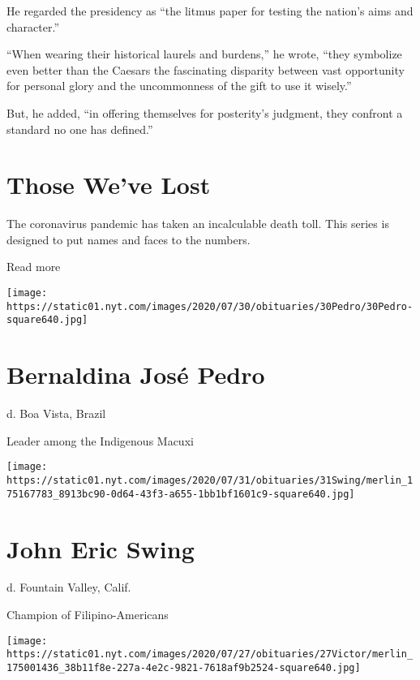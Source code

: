 He regarded the presidency as ``the litmus paper for testing the
nation's aims and character.''

``When wearing their historical laurels and burdens,'' he wrote, ``they
symbolize even better than the Caesars the fascinating disparity between
vast opportunity for personal glory and the uncommonness of the gift to
use it wisely.''

But, he added, ``in offering themselves for posterity's judgment, they
confront a standard no one has defined.''

\href{https://www.nytimes.com/interactive/2020/obituaries/people-died-coronavirus-obituaries.html?action=click\&pgtype=Article\&state=default\&region=BELOW_MAIN_CONTENT\&context=covid_obits_promo}{}

\hypertarget{those-weve-lost}{%
\section{Those We've Lost}\label{those-weve-lost}}

The coronavirus pandemic has taken an incalculable death toll. This
series is designed to put names and faces to the numbers.

Read more

\texttt{[image: https://static01.nyt.com/images/2020/07/30/obituaries/30Pedro/30Pedro-square640.jpg]}

\hypertarget{bernaldina-josuxe9-pedro}{%
\section{Bernaldina José Pedro}\label{bernaldina-josuxe9-pedro}}

d. Boa Vista, Brazil

Leader among the Indigenous Macuxi

\texttt{[image: https://static01.nyt.com/images/2020/07/31/obituaries/31Swing/merlin\_175167783\_8913bc90-0d64-43f3-a655-1bb1bf1601c9-square640.jpg]}

\hypertarget{john-eric-swing}{%
\section{John Eric Swing}\label{john-eric-swing}}

d. Fountain Valley, Calif.

Champion of Filipino-Americans

\texttt{[image: https://static01.nyt.com/images/2020/07/27/obituaries/27Victor/merlin\_175001436\_38b11f8e-227a-4e2c-9821-7618af9b2524-square640.jpg]}

